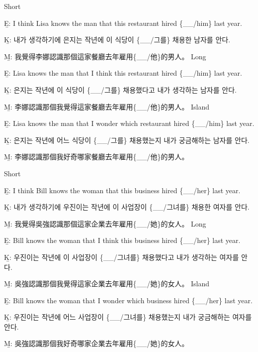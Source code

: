 \pex %
\a Short\par\nobreak
\beginsubsub
\b{E:} I think Lisa knows the man that this restaurant hired \{\_\_/him\} last year.\par\nobreak
\b{K:} \ko 내가 생각하기에 은지는 작년에 이 식당이 \{\_\_/그를\} 채용한 남자를 안다. \normalfont\par\nobreak
\b{M:} \zh 我覺得李娜認識那個這家餐廳去年雇用\{\_\_/他\}的男人。 \normalfont
\endsubsub
\a Long\par\nobreak
\beginsubsub
\b{E:} Lisa knows the man that I think this restaurant hired \{\_\_/him\} last year.\par\nobreak
\b{K:} \ko 은지는 작년에 이 식당이 \{\_\_/그를\} 채용했다고 내가 생각하는 남자를 안다. \normalfont\par\nobreak
\b{M:} \zh 李娜認識那個我覺得這家餐廳去年雇用\{\_\_/他\}的男人。 \normalfont
\endsubsub
\a Island\par\nobreak
\beginsubsub
\b{E:} Lisa knows the man that I wonder which restaurant hired \{\_\_/him\} last year.\par\nobreak
\b{K:} \ko 은지는 작년에 어느 식당이 \{\_\_/그를\} 채용했는지 내가 궁금해하는 남자를 안다\normalfont.\par\nobreak
\b{M:} \zh 李娜認識那個我好奇哪家餐廳去年雇用\{\_\_/他\}的男人。\normalfont
\endsubsub
\xe

\pex %
\a Short\par\nobreak
\beginsubsub
\b{E:} I think Bill knows the woman that this business hired \{\_\_/her\} last year.\par\nobreak
\b{K:} \ko 내가 생각하기에 우진이는 작년에 이 사업장이 \{\_\_/그녀를\} 채용한 여자를 안다. \normalfont\par\nobreak
\b{M:} \zh 我覺得吳強認識那個這家企業去年雇用\{\_\_/她\}的女人。 \normalfont
\endsubsub
\a Long\par\nobreak
\beginsubsub
\b{E:} Bill knows the woman that I think this business hired \{\_\_/her\} last year.\par\nobreak
\b{K:} \ko 우진이는 작년에 이 사업장이 \{\_\_/그녀를\} 채용했다고 내가 생각하는 여자를 안다. \normalfont\par\nobreak
\b{M:} \zh 吳強認識那個我覺得這家企業去年雇用\{\_\_/她\}的女人。 \normalfont
\endsubsub
\a Island\par\nobreak
\beginsubsub
\b{E:} Bill knows the woman that I wonder which business hired \{\_\_/her\} last year.\par\nobreak
\b{K:} \ko 우진이는 작년에 어느 사업장이 \{\_\_/그녀를\} 채용했는지 내가 궁금해하는 여자를 안다\normalfont.\par\nobreak
\b{M:} \zh 吳強認識那個我好奇哪家企業去年雇用\{\_\_/她\}的女人。\normalfont
\endsubsub
\xe

